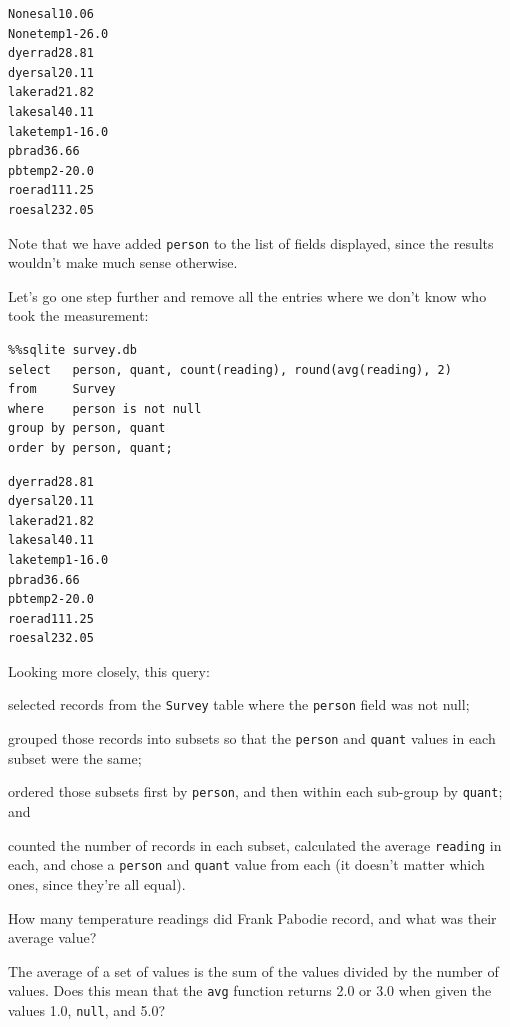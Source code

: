 \documentclass{book}
\begin{document}
\begin{verbatim}
Nonesal10.06
Nonetemp1-26.0
dyerrad28.81
dyersal20.11
lakerad21.82
lakesal40.11
laketemp1-16.0
pbrad36.66
pbtemp2-20.0
roerad111.25
roesal232.05
\end{verbatim}

Note that we have added \texttt{person} to the list of fields displayed,
since the results wouldn't make much sense otherwise.

Let's go one step further and remove all the entries where we don't know
who took the measurement:

\begin{verbatim}
%%sqlite survey.db
select   person, quant, count(reading), round(avg(reading), 2)
from     Survey
where    person is not null
group by person, quant
order by person, quant;
\end{verbatim}

\begin{verbatim}
dyerrad28.81
dyersal20.11
lakerad21.82
lakesal40.11
laketemp1-16.0
pbrad36.66
pbtemp2-20.0
roerad111.25
roesal232.05
\end{verbatim}

Looking more closely, this query:

\begin{swcenumerate}
\item
  selected records from the \texttt{Survey} table where the
  \texttt{person} field was not null;
\item
  grouped those records into subsets so that the \texttt{person} and
  \texttt{quant} values in each subset were the same;
\item
  ordered those subsets first by \texttt{person}, and then within each
  sub-group by \texttt{quant}; and
\item
  counted the number of records in each subset, calculated the average
  \texttt{reading} in each, and chose a \texttt{person} and
  \texttt{quant} value from each (it doesn't matter which ones, since
  they're all equal).
\end{swcenumerate}

\begin{challenge}
  How many temperature readings did Frank Pabodie record, and what was
  their average value?
\end{challenge}

\begin{challenge}
  The average of a set of values is the sum of the values divided by the
  number of values. Does this mean that the \texttt{avg} function
  returns 2.0 or 3.0 when given the values 1.0, \texttt{null}, and 5.0?
\end{challenge}
\end{document}
